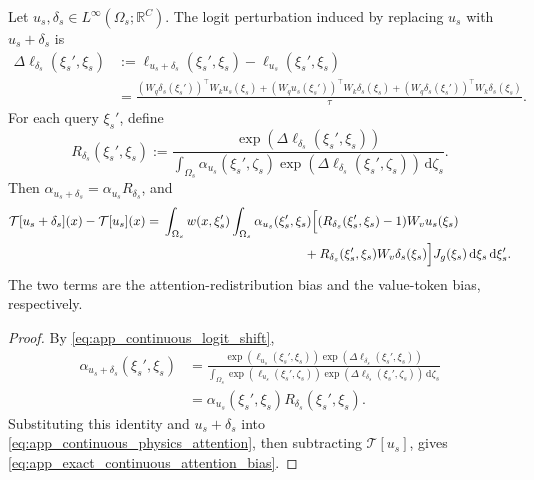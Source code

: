 \begin{lemma}
\label{lem:app_exact_continuous_attention_bias}
Let $u_s,\delta_s\in L^{\infty}(\Omega_s;\mathbb{R}^{C})$. The logit perturbation induced by replacing $u_s$ with $u_s+\delta_s$ is
\begin{align}
    \Delta\ell_{\delta_s}(\xi_s',\xi_s)
    &:=\ell_{u_s+\delta_s}(\xi_s',\xi_s)-\ell_{u_s}(\xi_s',\xi_s)
    \nonumber\\
    &=\frac{(W_q\delta_s(\xi_s'))^{\top}W_ku_s(\xi_s)
    +(W_qu_s(\xi_s'))^{\top}W_k\delta_s(\xi_s)
    +(W_q\delta_s(\xi_s'))^{\top}W_k\delta_s(\xi_s)}{\tau}.
    \label{eq:app_continuous_logit_shift}
\end{align}
For each query $\xi_s'$, define
\begin{equation}
    R_{\delta_s}(\xi_s',\xi_s)
    :=\frac{\exp(\Delta\ell_{\delta_s}(\xi_s',\xi_s))}
    {\int_{\Omega_s}\alpha_{u_s}(\xi_s',\zeta_s)
    \exp(\Delta\ell_{\delta_s}(\xi_s',\zeta_s))\,\mathrm{d}\zeta_s}.
    \label{eq:app_continuous_attention_ratio}
\end{equation}
Then $\alpha_{u_s+\delta_s}=\alpha_{u_s}R_{\delta_s}$, and
\begin{align}
    \mathcal{T}[u_s+\delta_s](x)-\mathcal{T}[u_s](x)
    ={}&\int_{\Omega_s}w(x,\xi_s')
    \int_{\Omega_s}\alpha_{u_s}(\xi_s',\xi_s)
    \Big[(R_{\delta_s}(\xi_s',\xi_s)-1)W_vu_s(\xi_s)
    \nonumber\\
    &\hspace{39mm}
    +R_{\delta_s}(\xi_s',\xi_s)W_v\delta_s(\xi_s)\Big]
    J_g(\xi_s)\,\mathrm{d}\xi_s\,\mathrm{d}\xi_s'.
    \label{eq:app_exact_continuous_attention_bias}
\end{align}
The two terms are the attention-redistribution bias and the value-token bias, respectively.
\end{lemma}

\begin{proof}
By \eqref{eq:app_continuous_logit_shift},
\begin{align}
    \alpha_{u_s+\delta_s}(\xi_s',\xi_s)
    &=\frac{\exp(\ell_{u_s}(\xi_s',\xi_s))
    \exp(\Delta\ell_{\delta_s}(\xi_s',\xi_s))}
    {\int_{\Omega_s}\exp(\ell_{u_s}(\xi_s',\zeta_s))
    \exp(\Delta\ell_{\delta_s}(\xi_s',\zeta_s))\,\mathrm{d}\zeta_s}
    \nonumber\\
    &=\alpha_{u_s}(\xi_s',\xi_s)R_{\delta_s}(\xi_s',\xi_s).
    \label{eq:app_continuous_shifted_kernel}
\end{align}
Substituting this identity and $u_s+\delta_s$ into \eqref{eq:app_continuous_physics_attention}, then subtracting $\mathcal{T}[u_s]$, gives \eqref{eq:app_exact_continuous_attention_bias}.
\end{proof}

